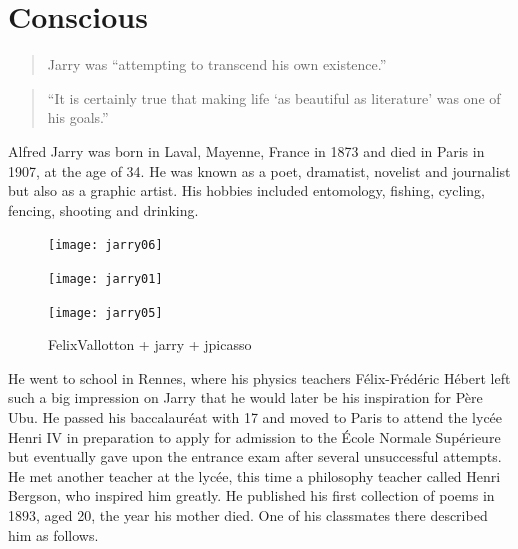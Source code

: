 \section{Conscious}

\begin{quote}
  Jarry was ``attempting to transcend his own existence.'' \citep{Hugill2012}
\end{quote}

\begin{quote}
  ``It is certainly true that making life `as beautiful as literature' was one of his goals.'' \citep{Hugill2012}
\end{quote}

Alfred Jarry was born in Laval, Mayenne, France in 1873 and died in Paris in 1907, at the age of 34. He was known as a poet, dramatist, novelist and journalist but also as a graphic artist. His hobbies included entomology, fishing, cycling, fencing, shooting and drinking.

\begin{figure}[htb]
  \centering
  \begin{minipage}{.275\linewidth}
    \texttt{[image: jarry06]}
  \end{minipage}
  \hspace{.05\linewidth}
  \begin{minipage}{.275\linewidth}
    \texttt{[image: jarry01]}
  \end{minipage}
  \hspace{.05\linewidth}
  \begin{minipage}{.275\linewidth}
    \texttt{[image: jarry05]}
  \end{minipage}
  \caption[figures1--3]{FelixVallotton + jarry + jpicasso}
\label{img123}
\end{figure}

He went to school in Rennes, where his physics teachers Félix-Frédéric Hébert left such a big impression on Jarry that he would later be his inspiration for Père Ubu. He passed his baccalauréat with 17 and moved to Paris to attend the lycée Henri IV in preparation to apply for admission to the École Normale Supérieure but eventually gave upon the entrance exam after several unsuccessful attempts. He met another teacher at the lycée, this time a philosophy teacher called Henri Bergson, who inspired him greatly. He published his first collection of poems in 1893, aged 20, the year his mother died. One of his classmates there described him as follows.

